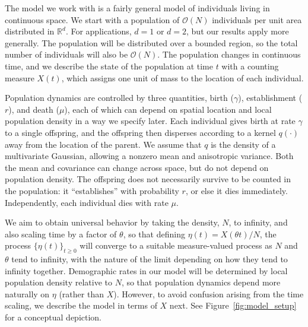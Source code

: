 \documentclass[12pt]{article}
\newcommand{\IR}{\mathbb R}
\newcommand{\bigO}{\mathcal{O}}
\begin{document}
The model we work with is a fairly general model
of individuals living in continuous space.
We start with a population of
$\bigO(N)$ individuals per unit area distributed in $\IR^d$.
For applications, $d=1$ or $d=2$, but our results apply more generally.
The population will be distributed over a bounded region,
so the total number of individuals will also be $\bigO(N)$.
The population changes in continuous time, and
we describe the state of the population at time $t$ with a counting measure $X(t)$,
which assigns one unit of mass to the location of each individual.

Population dynamics are controlled by three quantities,
birth ($\gamma$), establishment ($r$), and death ($\mu$),
each of which can depend on spatial location and local population density
in a way we specify later.
Each individual gives birth at rate $\gamma$ to a single offspring,
and the offspring
then disperses according to a kernel $q(\cdot)$ away from the location of the parent.
We assume that $q$ is the density of a multivariate Gaussian,
allowing a nonzero mean and anisotropic variance.
Both the mean and covariance can change across space,
but do not depend on population density.
The offspring does not necessarily survive to be counted in the population:
it ``establishes'' with probability $r$,
or else it dies immediately.
Independently, each individual dies with rate $\mu$.

We aim to obtain universal behavior by taking the density, $N$, to infinity,
and also scaling time by a factor of $\theta$,
so that defining $\eta(t) = X(\theta t) / N$,
the process $\{\eta(t)\}_{t \ge 0}$
will converge to a suitable measure-valued process
as $N$ and $\theta$ tend to infinity,
with the nature of the limit depending on how they tend to infinity together.
Demographic rates in our model
will be determined by local population density relative to $N$,
so that population dynamics depend more naturally on $\eta$ (rather than $X$).
However, to avoid confusion arising from the time scaling,
we describe the model in terms of $X$ next.
See Figure~\ref{fig:model_setup} for a conceptual depiction.
\end{document}
